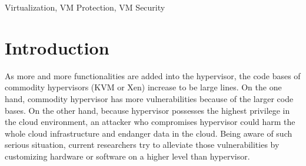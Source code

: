 \documentclass[conference]{IEEEtran}
\begin{document}
\begin{IEEEkeywords}
Virtualization, VM Protection, VM Security
\end{IEEEkeywords}

\section{Introduction}

As more and more functionalities are added into the hypervisor, the code bases of commodity hypervisors (KVM or Xen) increase to be large lines. On the one hand, commodity hypervisor has more vulnerabilities because of the larger code bases. On the other hand, because hypervisor possesses the highest privilege in the cloud environment, an attacker who compromises hypervisor could harm the whole cloud infrastructure and endanger data in the cloud.
Being aware of such serious situation, current researchers try to alleviate those vulnerabilities by customizing hardware or software on a higher level than hypervisor.
\end{document}
